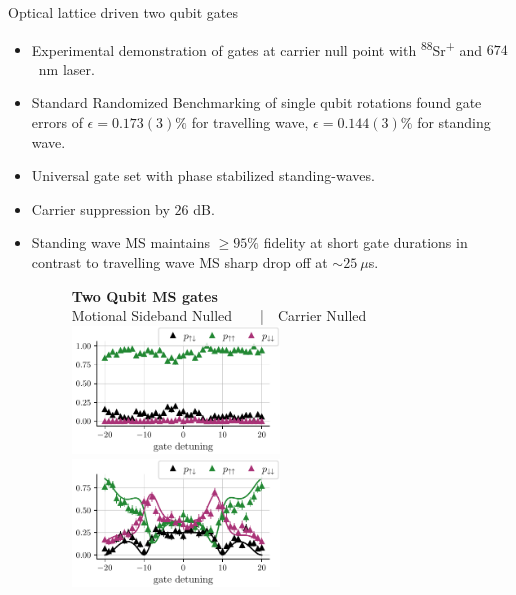 \documentclass[final]{beamer}
\begin{document}
\begin{frame}{}
\begin{center}
\begin{columns}[t]
\begin{column}{0.49\textwidth}
    \begin{alertblock}{Optical lattice driven two qubit gates}
      \begin{minipage}{0.60\linewidth}
      \begin{itemize}
        \item Experimental demonstration of gates at carrier null
          point with \textsuperscript{88}Sr\textsuperscript{+} and
          $674$~nm laser.
        \item Standard Randomized Benchmarking of single qubit
          rotations found gate errors of $\epsilon = 0.173(3)\%$ for
          travelling wave, $\epsilon = 0.144(3)\%$ for standing
          wave.
        \item Universal gate set with phase stabilized standing-waves.
        \item Carrier suppression by $26$ dB.
        \item Standing wave MS maintains $\geq 95\%$ fidelity at short gate durations in contrast to travelling wave MS sharp drop off at $\sim 25~\mu$s.\\
      \begin{figure}
        \center
        \textbf{\large Two Qubit MS gates\normalsize} \\
        \hspace*{-2.5em}Motional Sideband Nulled~~~~|~~\quad\quad\quad Carrier Nulled~~~~~~ \\
        \hspace*{-1.3em}\includegraphics[width=0.52\textwidth]{./figs/detuning_scan_100us_carrier_coupling.pdf}
        \hspace*{-1em}\includegraphics[width=0.52\textwidth]{./figs/detuning_scan_100us_gate.pdf}

\end{figure}
\end{itemize}
\end{minipage}
\end{alertblock}
\end{column}
\end{columns}
\end{center}
\end{frame}
\end{document}
